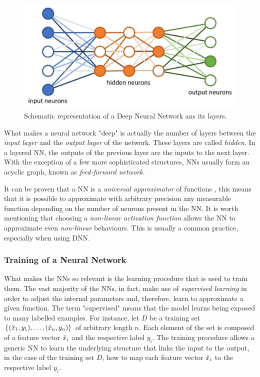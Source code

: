 \begin{figure}[H]
	\centering
	\includegraphics[width=12cm, keepaspectratio]{img/2_2_dnn.jpeg}
	\caption{Schematic representation of a Deep Neural Network ans its layers.}
\end{figure}

What makes a neural network "deep" is actually the number of layers between the \textit{input layer} and the \textit{output layer} of the network.
These layers are called \textit{hidden}.
In a layered NN, the outputs of the previous layer are the inputs to the next layer.
With the exception of a few more sophisticated structures, NNs usually form an acyclic graph, known as \textit{feed-forward network}.

It can be proven that a NN is a \textit{universal approximator} of functions \cite{hornik1989multilayer}, this means that it is possible to approximate with arbitrary precision any measurable function depending on the number of neurons present in the NN.
It is worth mentioning that choosing a \textit{non-linear activation function} allows the NN to approximate even \textit{non-linear} behaviours.
This is usually a common practice, especially when using DNN.

\subsubsection{Training of a Neural Network}
What makes the NNs so relevant is the learning procedure that is used to train them.
The vast majority of the NNs, in fact, make use of \textit{supervised learning} \cite{liu2017survey} in order to adjust the internal parameters and, therefore, learn to approximate a given function.
The term "supervised" means that the model learns being exposed to many labelled examples.
For instance, let $D$ be a training set $\{(\Bar{x}_1, y_1), \dots, (\Bar{x}_n, y_n)\}$ of arbitrary length $n$.
Each element of the set is composed of a feature vector $\Bar{x}_i$ and the respective label $y_i$.
The training procedure allows a generic NN to learn the underlying structure that links the input to the output, in the case of the training set $D$, how to map each feature vector $\Bar{x}_i$ to the respective label $y_i$.

